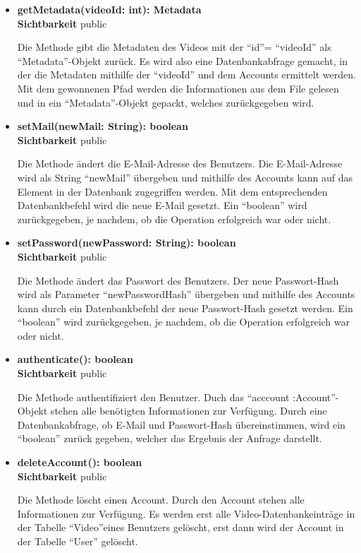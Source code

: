 \begin{itemize}
\item \textbf{getMetadata(videoId: int): Metadata}\hfill\\
\textbf{Sichtbarkeit} public

Die Methode gibt die Metadaten des Videos mit der ``id''= ``videoId'' als ``Metadata''-Objekt zurück. Es wird also eine Datenbankabfrage gemacht, in der die Metadaten mithilfe der ``videoId'' und dem Accounts ermittelt werden. Mit dem gewonnenen Pfad werden die Informationen aus dem File gelesen und in ein ``Metadata''-Objekt gepackt, welches zurückgegeben wird. 

\item \textbf{setMail(newMail: String): boolean}\hfill\\
\textbf{Sichtbarkeit} public

Die Methode ändert die E-Mail-Adresse des Benutzers. Die E-Mail-Adresse wird als String ``newMail'' übergeben und mithilfe des Accounts kann auf das Element in der Datenbank zugegriffen werden. Mit dem entsprechenden Datenbankbefehl wird die neue E-Mail gesetzt. Ein ``boolean'' wird zurückgegeben, je nachdem, ob die Operation erfolgreich war oder nicht.

\item \textbf{setPassword(newPassword: String): boolean}\hfill\\
\textbf{Sichtbarkeit} public

Die Methode ändert das Passwort des Benutzers. Der neue Passwort-Hash wird als Parameter ``newPasswordHash'' übergeben und mithilfe des Accounts kann durch ein Datenbankbefehl der neue Passwort-Hash gesetzt werden. Ein ``boolean'' wird zurückgegeben, je nachdem, ob die Operation erfolgreich war oder nicht.

\item \textbf{authenticate(): boolean}\hfill\\
\textbf{Sichtbarkeit} public

Die Methode authentifiziert den Benutzer. Duch das ``acccount :Account''-Objekt stehen alle benötigten Informationen zur Verfügung. Durch eine Datenbankabfrage, ob E-Mail und Passwort-Hash übereinstimmen, wird ein ``boolean'' zurück gegeben, welcher das Ergebnis der Anfrage darstellt.

\item \textbf{deleteAccount(): boolean}\hfill\\
\textbf{Sichtbarkeit} public

Die Methode löscht einen Account. Durch den Account stehen alle Informationen zur Verfügung. Es werden erst alle Video-Datenbankeinträge in der Tabelle ``Video''eines Benutzers gelöscht, erst dann wird der Account in der Tabelle ``User'' gelöscht.


\end{itemize}
